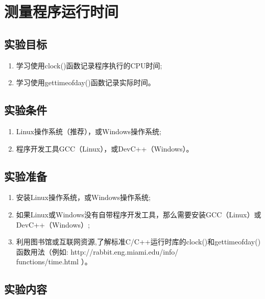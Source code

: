 
\chapter{测量程序运行时间}

\section{实验目标}

\begin{enumerate}
	\item 学习使用clock()函数记录程序执行的CPU时间;
	\item 学习使用gettimeofday()函数记录实际时间。
\end{enumerate}

\section{实验条件}

\begin{enumerate}
	\item Linux操作系统（推荐），或Windows操作系统;
	\item 程序开发工具GCC（Linux），或DevC++（Windows）。
\end{enumerate}

\section{实验准备}

\begin{enumerate}
	\item 安装Linux操作系统，或Windows操作系统;
	\item 如果Linux或Windows没有自带程序开发工具，那么需要安装GCC（Linux）或DevC++（Windows）;
	\item 利用图书馆或互联网资源,了解标准C/C++运行时库的clock()和gettimeofday()函数用法（例如: http://rabbit.eng.miami.edu/info/ \\
		functions/time.html ）。
\end{enumerate}

\section{实验内容}

